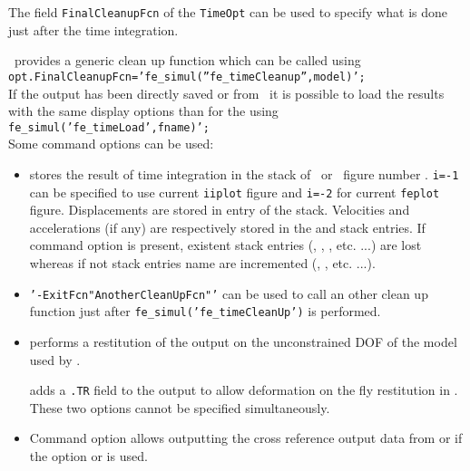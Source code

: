 The field {\tt FinalCleanupFcn} of the {\tt TimeOpt} can be used to specify what is done just after the time integration.\\
\begin{SDT} 
 \fesimul\ provides a generic clean up function which can be called using \\ 
{\tt opt.FinalCleanupFcn='fe\_simul(''fe\_timeCleanup'',model)';}\\
If the output has been directly saved or from \iiplot\, it is possible to load the results with the same display options than for the  using {\tt fe\_simul('fe\_timeLoad',fname)';}\\

Some command options can be used: \\
\begin{itemize}
\item {} stores the result of time integration in the stack of \iiplot\ or \feplot\ figure number . {\tt i=-1} can be specified to use current {\tt iiplot} figure and {\tt i=-2} for current {\tt feplot} figure. Displacements are stored in  entry of the stack. Velocities and accelerations (if any) are respectively stored in the  and  stack entries. If command option  is present, existent stack entries (, , , etc. ...) are lost whereas if not stack entries name are incremented (, , etc. ...).\\
\item {\tt '-ExitFcn"{\ti AnotherCleanUpFcn}"'} can be used to call an other clean up function just after {\tt fe\_simul('fe\_timeCleanUp')} is performed.
\item {} performs a restitution of the output on the
unconstrained DOF of the model used by \fetime. \par
{} adds a {\tt .TR} field to the output to allow deformation on the fly restitution in \feplot.  These two options cannot be specified simultaneously. 

\item Command option  allows outputting the cross reference output data from \iiplot or \feplot if the option  or  is used.
\end{itemize}
\end{SDT}



